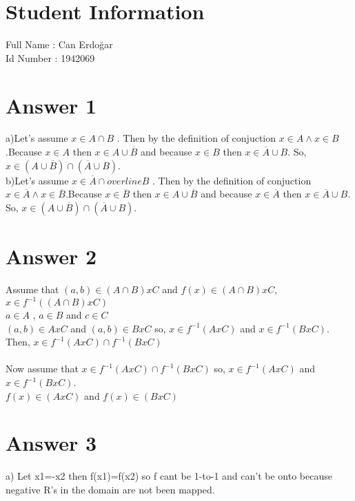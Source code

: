 \documentclass[12pt]{article}
\begin{document}
\section*{Student Information } 
Full Name :  Can Erdoğar \\
Id Number :  1942069 \\

\section*{Answer 1}
a)Let's assume $x \in A \cap B$ . Then by the definition of conjuction $x \in A \wedge x \in B$.Because $x \in A$ then $x \in A \cup \overline{B}$ and because $x \in B$ then $x \in \overline{A} \cup B$. So, $x \in (A \cup \overline{B}) \cap (\overline{A} \cup B)$. \\

b)Let's assume $x \in \overline{A} \cap overline{B}$ . Then by the definition of conjuction $x \in \overline{A} \wedge x \in \overline{B}$.Because $x \in \overline{B}$ then $x \in A \cup \overline{B}$ and because $x \in \overline{A}$ then $x \in \overline{A} \cup B$. So, $x \in (A \cup \overline{B}) \cap (\overline{A} \cup B)$. \\

\section*{Answer 2}
Assume that $(a,b) \in (A \cap B) x C$ and $f(x) \in (A \cap B) x C$, $x \in f^{-1}((A \cap B) x C) $ \\
$a \in A$ , $a \in B$ and $c \in C$ \\
$(a,b) \in AxC$ and $(a,b) \in BxC$ so, $x \in f^{-1}(AxC)$ and $x \in f^{-1}(BxC)$. \\
Then, $x \in f^{-1}(AxC) \cap f^{-1}(BxC)$ \\ \\

Now assume that $x \in f^{-1}(AxC) \cap f^{-1}(BxC)$ so, $x \in f^{-1}(AxC)$ and $x \in f^{-1}(BxC)$. \\
$f(x) \in (A x C)$ and $f(x) \in (BxC)$
  

\section*{Answer 3}
a) Let x1=-x2 then f(x1)=f(x2) so f cant be 1-to-1 and can't be onto because negative R's in the domain are not been mapped. \\
\end{document}

